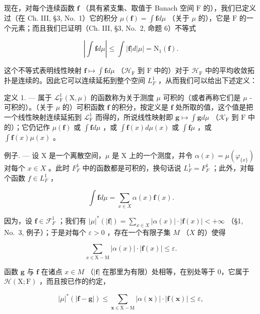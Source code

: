 现在，对每个连续函数 \(\mathbf{f}\) （具有紧支集、取值于 Banach 空间 \(\mathrm{F}\) 的），我们已定义过（在 Ch. III, §3, No.~1）它的积分 \(\mu(\mathbf{f}) = \int \mathbf{f} d\mu\) （关于 \(\mu\) 的），它是 \(\mathrm{F}\) 的一个元素；而且我们已证明（Ch. III, §3, No.~2, 命题 6）不等式

\[
\left| \int \mathbf {f} d \mu \right| \leqslant \int | \mathbf {f} | d | \mu | = \mathrm{N} _ {1} (\mathbf {f}).\tag{1}
\]

这个不等式表明线性映射 \(\mathbf{f} \mapsto \int \mathbf{f} d\mu\) （\(\mathcal{H}_{\mathrm{F}}\) 到 \(\mathrm{F}\) 中的）对于 \(\mathcal{H}_{\mathrm{F}}\) 中的平均收敛拓扑是连续的。因此它可以连续延拓到整个空间 \(L_{F}^{1}\) ，从而我们可以给出下述定义：

定义 1. --- 属于 \(\mathcal{L}_{\mathrm{F}}^{1}(\mathrm{X},\mu)\) 的函数称为关于测度 \(\mu\) 可积的（或者再称它们是 \(\mu\) -可积的）。（关于 \(\mu\) 的）可积函数 \(\mathbf{f}\) 的积分，按定义是 \(\mathbf{f}\) 处所取的值，这个值是把一个线性映射连续延拓到 \(\mathcal{L}_{\mathrm{F}}^{1}\) 而得的，所说线性映射即 \(\mathbf{g} \mapsto \int \mathbf{g} d\mu\) （\(\mathcal{K}_{\mathrm{F}}\) 到 \(\mathrm{F}\) 中的）；它仍记作 \(\mu(\mathbf{f})\) 或 \(\int \mathbf{f} d\mu\) ，或 \(\int \mathbf{f}(x) d\mu(x)\) 或 \(\int \mathbf{f}\mu\) ，或 \(\int \mathbf{f}(x)\mu(x)\) 。

例子. --- 设 X 是一个离散空间，\(\mu\) 是 X 上的一个测度，并令 \(\alpha(x) = \mu(\varphi_{\{x\}})\) 对每个 \(x \in X\) 。此时 \(F_{F}^{1}\) 中的函数都是可积的，换句话说 \(L_{F}^{1} = F_{F}^{1}\) ；此外，对每个函数 \(f \in L_{F}^{1}\) ，

\[
\int \mathbf {f} d \mu = \sum_ {x \in X} \alpha (x) \mathbf {f} (x).
\]

因为，设 \(\mathbf{f} \in \mathcal{F}_F^1\) ；我们有 \(|\mu|^*(|\mathbf{f}|) = \sum_{x \in X} |\alpha(x)| \cdot |\mathbf{f}(x)| < +\infty\) （§1, No.~3, 例子）；于是对每个 \(\varepsilon > 0\) ，存在一个有限子集 \(M\) （\(X\) 的）使得

\[
\sum_ {x \in \mathrm{X} - \mathrm{M}} | \alpha (x) | \cdot | \mathbf {f} (x) | \leqslant \varepsilon .
\]

函数 \(\mathbf{g}\) 与 \(\mathbf{f}\) 在诸点 \(x\in M\) （\(|\mathbf{f}|\) 在那里为有限）处相等，在别处等于 0，它属于 \(\mathcal{H}(\mathrm{X};\mathrm{F})\) ，而且按已作的约定，

\[
| \mu | ^ {*} (| \mathbf {f} - \mathbf {g} |) \leqslant \sum_ {\boldsymbol {x} \in \mathrm{X} - \mathrm{M}} | \alpha (\boldsymbol {x}) | \cdot | \mathbf {f} (\boldsymbol {x}) | \leqslant \varepsilon ,
\]

